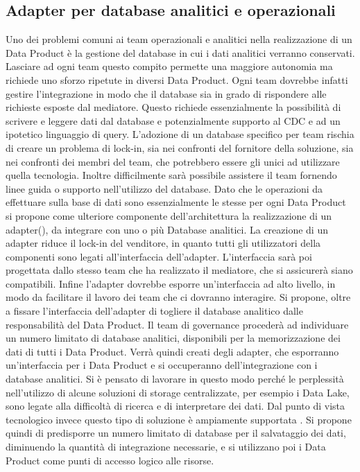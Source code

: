 \documentclass[12pt]{report}
\begin{document}
\subsection{Adapter per database analitici e operazionali}
Uno dei problemi comuni ai team operazionali e analitici nella realizzazione di un Data Product è la gestione del database in cui i dati analitici verranno conservati.
Lasciare ad ogni team questo compito permette una maggiore autonomia ma richiede uno sforzo ripetute in diversi Data Product.
Ogni team dovrebbe infatti gestire l'integrazione in modo che il database sia in grado di rispondere alle richieste esposte dal mediatore.
Questo richiede essenzialmente la possibilità di scrivere e leggere dati dal database e potenzialmente supporto al CDC e ad un ipotetico linguaggio di query.
L'adozione di un database specifico per team rischia di creare un problema di lock-in, sia nei confronti del fornitore della soluzione, sia nei confronti dei membri del team, che potrebbero essere gli unici ad utilizzare quella tecnologia.
Inoltre difficilmente sarà possibile assistere il team fornendo linee guida o supporto nell'utilizzo del database.
Dato che le operazioni da effettuare sulla base di dati sono essenzialmente le stesse per ogni Data Product si propone come ulteriore componente dell'architettura la realizzazione di un adapter(\cite{designPatterns}), da integrare con uno o più Database analitici.
La creazione di un adapter riduce il lock-in del venditore, in quanto tutti gli utilizzatori della componenti sono legati all'interfaccia dell'adapter.
L'interfaccia sarà poi progettata dallo stesso team che ha realizzato il mediatore, che si assicurerà siano compatibili.
Infine l'adapter dovrebbe esporre un'interfaccia ad alto livello, in modo da facilitare il lavoro dei team che ci dovranno interagire.
Si propone, oltre a fissare l'interfaccia dell'adapter di togliere il database analitico dalle responsabilità del Data Product.
Il team di governance procederà ad individuare un numero limitato di database analitici, disponibili per la memorizzazione dei dati di tutti i Data Product.
Verrà quindi creati degli adapter, che esporranno un'interfaccia per i Data Product e si occuperanno dell'integrazione con i database analitici.
Si è pensato di lavorare in questo modo perché le perplessità nell'utilizzo di alcune soluzioni di storage centralizzate, per esempio i Data Lake, sono legate alla difficoltà di ricerca e di interpretare dei dati. 
Dal punto di vista tecnologico invece questo tipo di soluzione è ampiamente supportata .
Si propone quindi di predisporre un numero limitato di database per il salvataggio dei dati, diminuendo la quantità di integrazione necessarie, e si utilizzano poi i Data Product come punti di accesso logico alle risorse.
\end{document}
